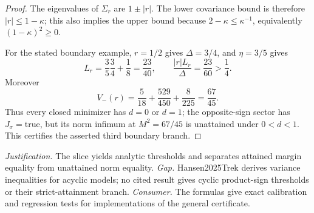 \documentclass{article}
\begin{document}
\begin{proof}
The eigenvalues of \(\Sigma_r\) are \(1\pm|r|\).  The lower covariance bound is therefore \(|r|\le1-\kappa\); this also implies the upper bound because \(2-\kappa\le\kappa^{-1}\), equivalently \((1-\kappa)^2\ge0\).

For the stated boundary example, \(r=1/2\) gives \(\Delta=3/4\), and \(\eta=3/5\) gives
\[
 L_r=\frac35\frac34+\frac18=\frac{23}{40},\qquad
 \frac{|r|L_r}{\Delta}=\frac{23}{60}>\frac14.
\]
Moreover
\[
 V_-(r)=\frac5{18}+\frac{529}{450}+\frac8{225}=\frac{67}{45}.
\]
Thus every closed minimizer has \(d=0\) or \(d=1\); the opposite-sign sector has \(J_{\sigma}=\mathrm{true}\), but its norm infimum at \(M^2=67/45\) is unattained under \(0<d<1\).  This certifies the asserted third boundary branch.
\end{proof}
\par\smallskip\noindent \textit{Justification.} The slice yields analytic thresholds and separates attained margin equality from unattained norm equality. \textit{Gap.} Hansen2025Trek derives variance inequalities for acyclic models; no cited result gives cyclic product-sign thresholds or their strict-attainment branch. \textit{Consumer.} The formulas give exact calibration and regression tests for implementations of the general certificate.
\end{document}
